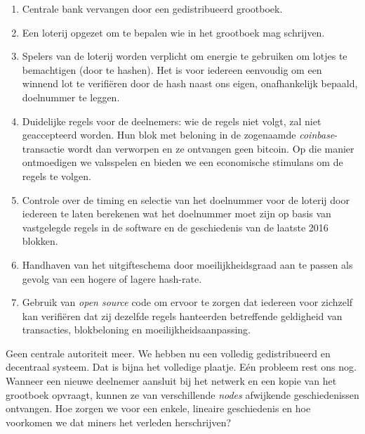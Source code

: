 \begin{enumerate}
\item Centrale bank vervangen door een gedistribueerd grootboek.
\item Een loterij opgezet om te bepalen wie in het grootboek mag schrijven.
\item Spelers van de loterij worden verplicht om energie te gebruiken om lotjes te bemachtigen (door te hashen). Het is voor iedereen eenvoudig om een winnend lot te verifiëren door de hash naast ons eigen, onafhankelijk bepaald, doelnummer te leggen.
\item Duidelijke regels voor de deelnemers: wie de regels niet volgt, zal niet geaccepteerd worden. Hun blok met beloning in de zogenaamde \textit{coinbase}-transactie wordt dan verworpen en ze ontvangen geen bitcoin. Op die manier ontmoedigen we valsspelen en bieden we een economische stimulans om de regels te volgen.
\item Controle over de timing en selectie van het doelnummer voor de loterij door iedereen te laten berekenen wat het doelnummer moet zijn op basis van vastgelegde regels in de software en de geschiedenis van de laatste 2016 blokken.
\item Handhaven van het uitgifteschema door moeilijkheidsgraad aan te passen als gevolg van een hogere of lagere hash-rate.
\item Gebruik van \textit{open source} code om ervoor te zorgen dat iedereen voor zichzelf kan verifiëren dat zij dezelfde regels hanteerden betreffende geldigheid van transacties, blokbeloning en moeilijkheidsaanpassing.
\end{enumerate}
Geen centrale autoriteit meer. We hebben nu een volledig gedistribueerd en decentraal systeem. Dat is bijna het volledige plaatje. Eén probleem rest ons nog. Wanneer een nieuwe deelnemer aansluit bij het netwerk en een kopie van het grootboek opvraagt, kunnen ze van verschillende \textit{nodes} afwijkende geschiedenissen ontvangen. Hoe zorgen we voor een enkele, lineaire geschiedenis en hoe voorkomen we dat miners het verleden herschrijven?

